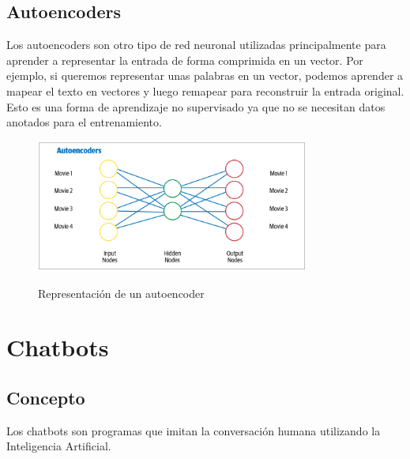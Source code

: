 \subsection{Autoencoders}
Los autoencoders son otro tipo de red neuronal utilizadas principalmente para aprender a
representar la
entrada de forma comprimida en un vector. Por ejemplo, si queremos representar unas palabras en un
vector,
podemos aprender a mapear el texto en vectores y luego remapear para reconstruir la entrada
original.
Esto es una forma de aprendizaje no supervisado ya que no se necesitan datos anotados para el
entrenamiento.\\

\begin{figure}[H]
	\centering
	\includegraphics[width=0.8\textwidth]{imagenes/Cap 2/autoencoder.png}
	\caption{Representación de un autoencoder}
	\label{fig:autoencoder}
	\cite{sowmya_practical_npl}
\end{figure}



\section{Chatbots}







\subsection{Concepto}
Los chatbots son programas que imitan la conversación humana utilizando la Inteligencia
Artificial.\cite{UniversityRelatedFAQS}
